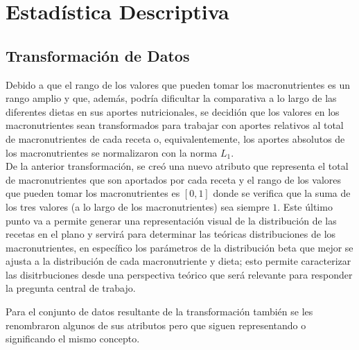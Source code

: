 \documentclass[12pt,a4paper]{article}
\begin{document}
\newpage

\section{Estadística Descriptiva}

    \subsection{Transformación de Datos}\label{subsec:data_trans}

        Debido a que el rango de los valores que pueden tomar los macronutrientes 
        es un rango amplio y que, además, podría dificultar la comparativa a lo largo 
        de las diferentes dietas en sus aportes nutricionales, se decidión que los 
        valores en los macronutrientes sean transformados para trabajar con aportes 
        relativos al total de macronutrientes de cada receta o, equivalentemente, los 
        aportes absolutos de los macronutrientes se normalizaron con la norma $L_1$.\\

        De la anterior transformación, se creó una nuevo atributo que representa el 
        total de macronutrientes que son aportados por cada receta y el rango de los 
        valores que pueden tomar los macronutrientes es $[0,1]$ donde se verifica que 
        la suma de los tres valores (a lo largo de los macronutrientes) sea siempre $1$. 
        Este último punto va a permite generar una representación visual de la distribución 
        de las recetas en el plano y servirá para determinar las teóricas distribuciones de 
        los macronutrientes, en específico los parámetros de la distribución beta que mejor 
        se ajusta a la distribución de cada macronutriente y dieta; esto permite caracterizar 
        las disitrbuciones desde una perspectiva teórico que será relevante para responder 
        la pregunta central de trabajo.

        Para el conjunto de datos resultante de la transformación también se les renombraron 
        algunos de sus atributos pero que siguen representando o significando el mismo concepto.
\end{document}
